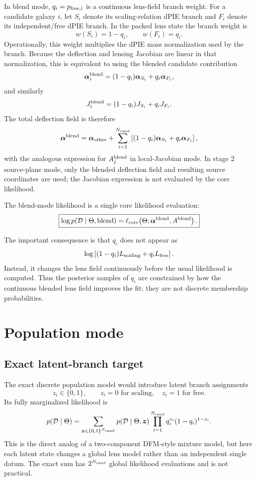 \documentclass[11pt]{article}
\newcommand{\data}{\mathcal{D}}
\begin{document}
In blend mode, $q_i=p_{\rm free,i}$ is a continuous lens-field branch weight.
For a candidate galaxy $i$, let $S_i$ denote its scaling-relation dPIE branch
and $F_i$ denote its independent/free dPIE branch. In the packed lens state the
branch weight is
\[
    w(S_i) = 1-q_i,
    \qquad
    w(F_i) = q_i.
\]
Operationally, this weight multiplies the dPIE mass normalization used by the
branch. Because the deflection and lensing Jacobian are linear in that
normalization, this is equivalent to using the blended candidate contribution
\[
    \bm{\alpha}_i^{\rm blend}
    =
    (1-q_i)\bm{\alpha}_{S_i}
    +
    q_i\bm{\alpha}_{F_i},
\]
and similarly
\[
    J_i^{\rm blend}
    =
    (1-q_i)J_{S_i}
    +
    q_iJ_{F_i}.
\]
The total deflection field is therefore
\[
    \bm{\alpha}^{\rm blend}
    =
    \bm{\alpha}_{\rm other}
    +
    \sum_{i=1}^{N_{\rm cand}}
    \left[
        (1-q_i)\bm{\alpha}_{S_i}
        +
        q_i\bm{\alpha}_{F_i}
    \right],
\]
with the analogous expression for $A_j^{\rm blend}$ in local-Jacobian mode.
In stage 2 source-plane mode, only the blended deflection field and resulting
source coordinates are used; the Jacobian expression is not evaluated by the
core likelihood.

The blend-mode likelihood is a single core likelihood evaluation:
\[
    \boxed{
    \log p(\data\mid \Theta,{\rm blend})
    =
    \ell_{\rm core}\!\left(\Theta;\bm{\alpha}^{\rm blend},A^{\rm blend}\right).
    }
\]

The important consequence is that $q_i$ does not appear as
\[
    \log\left[(1-q_i)L_{\rm scaling}+q_iL_{\rm free}\right].
\]
Instead, it changes the lens field continuously before the usual likelihood is
computed. Thus the posterior samples of $q_i$ are constrained by how the
continuous blended lens field improves the fit; they are not discrete
membership probabilities.

\section{Population mode}

\subsection{Exact latent-branch target}

The exact discrete population model would introduce latent branch assignments
\[
    z_i \in \{0,1\},
    \qquad
    z_i=0 \text{ for scaling},\quad z_i=1 \text{ for free}.
\]
Its fully marginalized likelihood is
\[
    p(\data\mid\Theta)
    =
    \sum_{\bm{z}\in\{0,1\}^{N_{\rm cand}}}
    p(\data\mid\Theta,\bm{z})
    \prod_{i=1}^{N_{\rm cand}}
    q_i^{z_i}(1-q_i)^{1-z_i}.
\]
This is the direct analog of a two-component DFM-style mixture model, but here
each latent state changes a global lens model rather than an independent
single datum. The exact sum has $2^{N_{\rm cand}}$ global likelihood
evaluations and is not practical.
\end{document}
